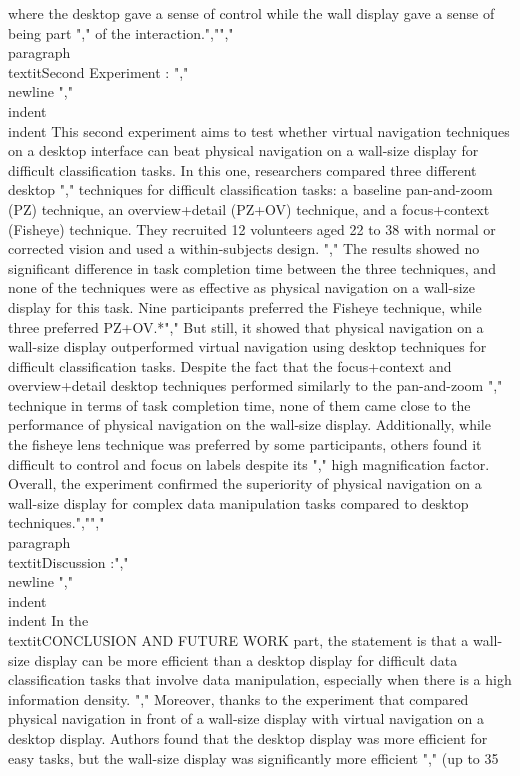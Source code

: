 where the desktop gave a sense of control while the wall display gave a sense of being part ","        of the interaction.","","        \\paragraph{ \\textit{Second Experiment :} ","                \\newline }","        \\indent \\indent This second experiment aims to test whether virtual navigation techniques on a desktop interface can beat physical navigation on a wall-size display for difficult classification tasks. In this one, researchers compared three different desktop ","        techniques for difficult classification tasks: a baseline pan-and-zoom (PZ) technique, an overview+detail (PZ+OV) technique, and a focus+context (Fisheye) technique. They recruited 12 volunteers aged 22 to 38 with normal or corrected vision and used a within-subjects design. ","        The results showed no significant difference in task completion time between the three techniques, and none of the techniques were as effective as physical navigation on a wall-size display for this task. Nine participants preferred the Fisheye technique, while three preferred PZ+OV.*","        But still, it  showed that physical navigation on a wall-size display outperformed virtual navigation using desktop techniques for difficult classification tasks. Despite the fact that the focus+context and overview+detail desktop techniques performed similarly to the pan-and-zoom ","        technique in terms of task completion time, none of them came close to the performance of physical navigation on the wall-size display. Additionally, while the fisheye lens technique was preferred by some participants, others found it difficult to control and focus on labels despite its ","        high magnification factor. Overall, the experiment confirmed the superiority of physical navigation on a wall-size display for complex data manipulation tasks compared to desktop techniques.","","        \\paragraph{ \\textit{Discussion :}","                \\newline }","        \\indent \\indent In the \\textit{CONCLUSION AND FUTURE WORK} part, the statement is that a wall-size display can be more efficient than a desktop display for difficult data classification tasks that involve data manipulation, especially when there is a high information density. ","        Moreover, thanks to the experiment that compared physical navigation in front of a wall-size display with virtual navigation on a desktop display. Authors found that the desktop display was more efficient for easy tasks, but the wall-size display was significantly more efficient ","        (up to 35\\%